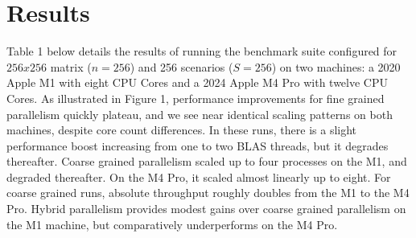 \documentclass{article}
\begin{document}
\section{Results}
\label{sec:headings}
Table 1 below details the results of running the benchmark suite configured for $256 x 256$ matrix ($n=256$) and 256 scenarios ($S=256$) on two machines: a 2020 Apple M1 with eight CPU Cores and a 2024 Apple M4 Pro with twelve CPU Cores. As illustrated in Figure 1, performance improvements for fine grained parallelism quickly plateau, and we see near identical scaling patterns on both machines, despite core count differences. In these runs, there is a slight performance boost increasing from one to two BLAS threads, but it degrades thereafter. Coarse grained parallelism scaled up to four processes on the M1, and degraded thereafter. On the M4 Pro, it scaled almost linearly up to eight. For coarse grained runs, absolute throughput roughly doubles from the M1 to the M4 Pro. Hybrid parallelism provides modest gains over coarse grained parallelism on the M1 machine, but comparatively underperforms on the M4 Pro.


\begingroup
\setlength{\aboverulesep}{0pt}
\setlength{\belowrulesep}{0pt}
\renewcommand{\arraystretch}{0.85}
\footnotesize
\end{document}
